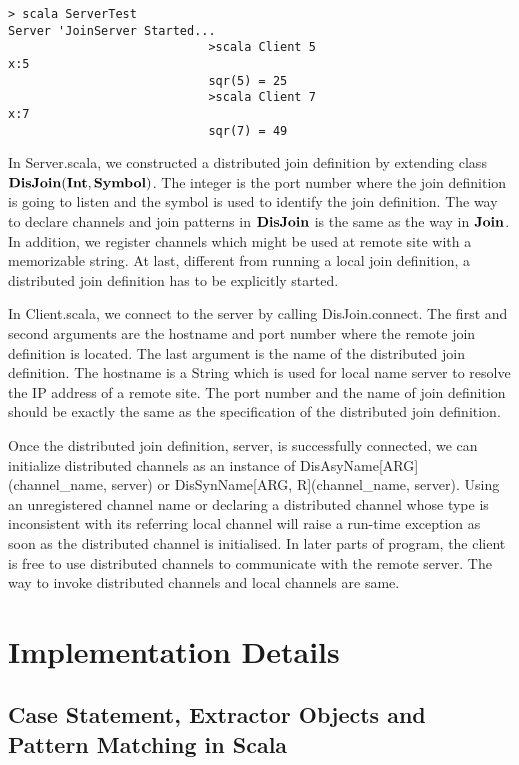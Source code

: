 \begin{lstlisting}
> scala ServerTest                                    
Server 'JoinServer Started...
							>scala Client 5
x:5
							sqr(5) = 25
							>scala Client 7
x:7
							sqr(7) = 49
\end{lstlisting}


In Server.scala, we constructed a distributed join definition by extending class \\ $\bf{DisJoin(Int, Symbol)}$.  The integer is the port number where the join definition is going to listen and the symbol is used to identify the join definition.  The way to declare channels and join patterns in $\bf{DisJoin}$ is the same as the way in $\bf{Join}$.  In addition, we register channels which might be used at remote site with a memorizable string.  At last, different from running a local join definition, a distributed join definition has to be explicitly started.

In Client.scala, we connect to the server by calling DisJoin.connect.  The first and second arguments are the hostname and port number where the remote join definition is located.  The last argument is the name of the distributed join definition.  The hostname is a String which is used for local name server to resolve the IP address of a remote site.  The port number and the name of join definition should be exactly the same as the specification of the distributed join definition.

Once the distributed join definition, server, is successfully connected, we can initialize distributed channels as an instance of DisAsyName[ARG](channel\_name, server) or DisSynName[ARG, R](channel\_name, server).  Using an unregistered channel name or declaring a distributed channel whose type is inconsistent with  its referring local channel will raise a run-time exception as soon as the distributed channel is initialised.  In later parts of program, the client is free to use distributed channels to communicate with the remote server.  The way to invoke distributed channels and local channels are same.

\section{Implementation Details}
\subsection{Case Statement, Extractor Objects and Pattern Matching in Scala}

